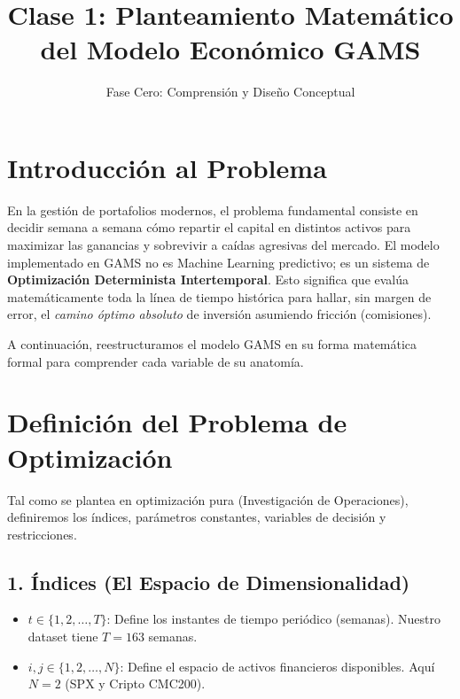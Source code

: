 \documentclass[11pt,a4paper]{article}
\title{\textbf{Clase 1: Planteamiento Matemático del Modelo Económico GAMS}}
\author{Fase Cero: Comprensión y Diseño Conceptual}
\date{}
\begin{document}
\maketitle

\section{Introducción al Problema}
En la gestión de portafolios modernos, el problema fundamental consiste en decidir semana a semana cómo repartir el capital en distintos activos para maximizar las ganancias y sobrevivir a caídas agresivas del mercado. El modelo implementado en GAMS no es Machine Learning predictivo; es un sistema de \textbf{Optimización Determinista Intertemporal}. Esto significa que evalúa matemáticamente toda la línea de tiempo histórica para hallar, sin margen de error, el \textit{camino óptimo absoluto} de inversión asumiendo fricción (comisiones).

A continuación, reestructuramos el modelo GAMS en su forma matemática formal para comprender cada variable de su anatomía.

\section{Definición del Problema de Optimización}

Tal como se plantea en optimización pura (Investigación de Operaciones), definiremos los índices, parámetros constantes, variables de decisión y restricciones.

\subsection{1. Índices (El Espacio de Dimensionalidad)}
\begin{itemize}
    \item $t \in \{1, 2, \ldots, T\}$: Define los instantes de tiempo periódico (semanas). Nuestro dataset tiene $T = 163$ semanas.
    \item $i, j \in \{1, 2, \ldots, N\}$: Define el espacio de activos financieros disponibles. Aquí $N=2$ (SPX y Cripto CMC200).
\end{itemize}
\end{document}
